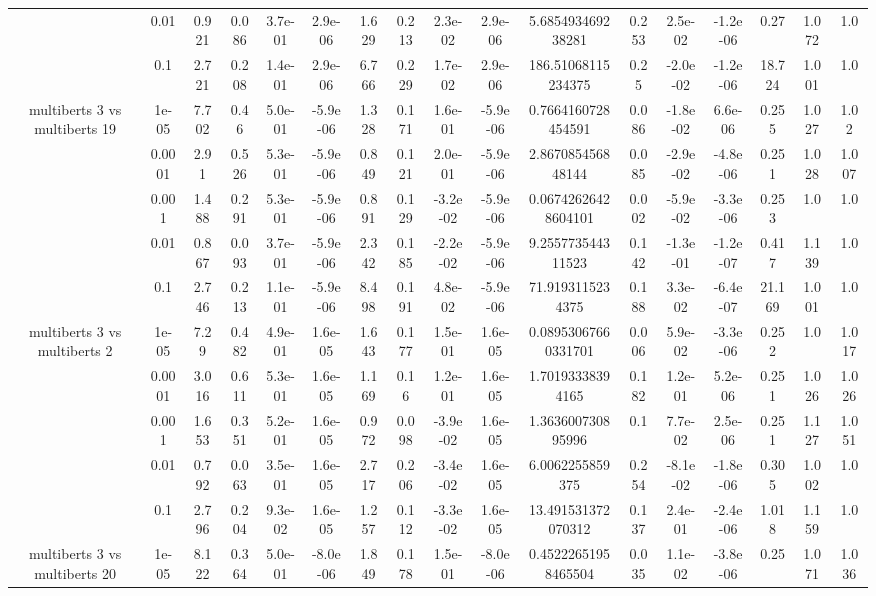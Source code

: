\begin{tabular}{|c|c|c|c|c|c|c|c|c|c|c|c|c|c|c|c|c|}
 & 0.01 & 0.921 & 0.086 & 3.7e-01 & 2.9e-06 & 1.629 & 0.213 & 2.3e-02 & 2.9e-06 & 5.685493469238281 & 0.253 & 2.5e-02 & -1.2e-06 & 0.27 & 1.072 & 1.0 \\
 & 0.1 & 2.721 & 0.208 & 1.4e-01 & 2.9e-06 & 6.766 & 0.229 & 1.7e-02 & 2.9e-06 & 186.51068115234375 & 0.25 & -2.0e-02 & -1.2e-06 & 18.724 & 1.001 & 1.0 \\
\hline
\multirow{5}{*}{multiberts 3 vs multiberts 19} & 1e-05 & 7.702 & 0.46 & 5.0e-01 & -5.9e-06 & 1.328 & 0.171 & 1.6e-01 & -5.9e-06 & 0.7664160728454591 & 0.086 & -1.8e-02 & 6.6e-06 & 0.255 & 1.027 & 1.02 \\
 & 0.0001 & 2.91 & 0.526 & 5.3e-01 & -5.9e-06 & 0.849 & 0.121 & 2.0e-01 & -5.9e-06 & 2.867085456848144 & 0.085 & -2.9e-02 & -4.8e-06 & 0.251 & 1.028 & 1.007 \\
 & 0.001 & 1.488 & 0.291 & 5.3e-01 & -5.9e-06 & 0.891 & 0.129 & -3.2e-02 & -5.9e-06 & 0.06742626428604101 & 0.002 & -5.9e-02 & -3.3e-06 & 0.253 & 1.0 & 1.0 \\
 & 0.01 & 0.867 & 0.093 & 3.7e-01 & -5.9e-06 & 2.342 & 0.185 & -2.2e-02 & -5.9e-06 & 9.255773544311523 & 0.142 & -1.3e-01 & -1.2e-07 & 0.417 & 1.139 & 1.0 \\
 & 0.1 & 2.746 & 0.213 & 1.1e-01 & -5.9e-06 & 8.498 & 0.191 & 4.8e-02 & -5.9e-06 & 71.9193115234375 & 0.188 & 3.3e-02 & -6.4e-07 & 21.169 & 1.001 & 1.0 \\
\hline
\multirow{5}{*}{multiberts 3 vs multiberts 2} & 1e-05 & 7.29 & 0.482 & 4.9e-01 & 1.6e-05 & 1.643 & 0.177 & 1.5e-01 & 1.6e-05 & 0.08953067660331701 & 0.006 & 5.9e-02 & -3.3e-06 & 0.252 & 1.0 & 1.017 \\
 & 0.0001 & 3.016 & 0.611 & 5.3e-01 & 1.6e-05 & 1.169 & 0.16 & 1.2e-01 & 1.6e-05 & 1.70193338394165 & 0.182 & 1.2e-01 & 5.2e-06 & 0.251 & 1.026 & 1.026 \\
 & 0.001 & 1.653 & 0.351 & 5.2e-01 & 1.6e-05 & 0.972 & 0.098 & -3.9e-02 & 1.6e-05 & 1.363600730895996 & 0.1 & 7.7e-02 & 2.5e-06 & 0.251 & 1.127 & 1.051 \\
 & 0.01 & 0.792 & 0.063 & 3.5e-01 & 1.6e-05 & 2.717 & 0.206 & -3.4e-02 & 1.6e-05 & 6.0062255859375 & 0.254 & -8.1e-02 & -1.8e-06 & 0.305 & 1.002 & 1.0 \\
 & 0.1 & 2.796 & 0.204 & 9.3e-02 & 1.6e-05 & 1.257 & 0.112 & -3.3e-02 & 1.6e-05 & 13.491531372070312 & 0.137 & 2.4e-01 & -2.4e-06 & 1.018 & 1.159 & 1.0 \\
\hline
\multirow{5}{*}{multiberts 3 vs multiberts 20} & 1e-05 & 8.122 & 0.364 & 5.0e-01 & -8.0e-06 & 1.849 & 0.178 & 1.5e-01 & -8.0e-06 & 0.45222651958465504 & 0.035 & 1.1e-02 & -3.8e-06 & 0.25 & 1.071 & 1.036 \\

\end{tabular}
